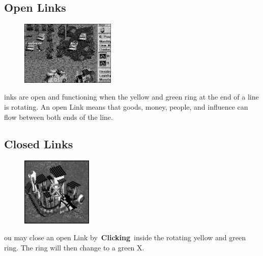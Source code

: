 \subsection{Open Links}


\begin{figure}
	\vspace{-20pt}
	\begin{center}
		\includegraphics[width=0.4\textwidth]{Iopenlink}
	\end{center}
	\vspace{-50pt}
\end{figure}

inks are open and functioning when the yellow and green ring at the end of a line is rotating. An open Link means that goods, money, people, and influence can flow between both ends of the line.

\subsection{Closed Links}


\begin{figure}
	\vspace{-20pt}
	\begin{center}
		\includegraphics[width=0.3\textwidth]{Icloselink_fort}
	\end{center}
	\vspace{-10pt}
\end{figure}

ou may close an open Link by \textbf{Clicking} inside the rotating yellow and green ring. The ring will then change to a green X.

